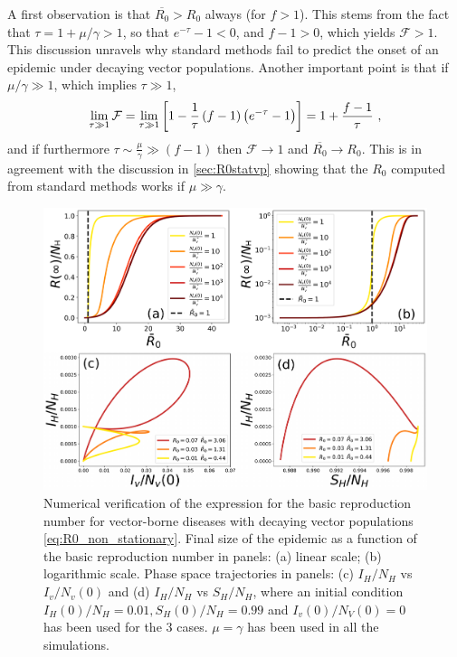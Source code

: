 A first observation is that $\overline{R_0}>R_0$ always (for $f>1$). This
stems from the fact that $\tau=1+\mu/\gamma>1$, so that $e^{-\tau}-1<0$, and
$f-1>0$, which yields $\mathcal{F}>1$. This discussion unravels why standard
methods fail to predict the onset of an epidemic under decaying vector
populations. Another important point is that if $\mu/\gamma\gg 1$, which
implies $\tau\gg1$,
\begin{equation}
    \lim_{\tau\gg1}\mathcal{F}=\lim_{\tau\gg1}\left[1-\frac{1}{\tau}
        \left(f-1\right)\left(e^{-\tau}-1\right)\right]=1+\frac{f-1}{\tau}\
    ,
\end{equation}
and if furthermore $\tau\sim\frac{\mu}{\gamma}\gg (f-1)$ then
$\mathcal{F}\to 1$ and $\overline{R_0}\to R_0$. This is in agreement with the
discussion in \cref{sec:R0statvp} showing that the $R_0$ computed from standard
methods works if $\mu\gg\gamma$.

\begin{figure}[H]
    \centering
    \includegraphics[width=1\textwidth]{Figures/R0_check_mean_value.pdf}
    \caption[Numerical verification of the expression for the non-stationaty
        basic reproduction number]{Numerical verification of the expression for
        the basic reproduction number for vector-borne diseases with decaying
        vector populations \cref{eq:R0_non_stationary}. Final size of the
        epidemic as a function of the basic reproduction number in panels: (a)
        linear scale; (b) logarithmic scale. Phase space trajectories in
        panels: (c) $I_H/N_H$ vs $I_v/N_v(0)$ and (d) $I_H/N_H$ vs $S_H/N_H$,
        where an initial condition $I_H(0)/N_H=0.01, S_H(0)/N_H=0.99$ and
        $I_v(0)/N_V(0)=0$ has been used for the $3$ cases.
        $\mu=\gamma$ has been used in all the simulations.}
    \label{fig:R0_check_mean_value}
\end{figure}

